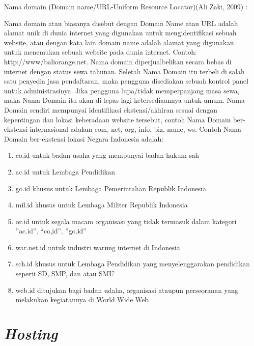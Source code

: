 Nama domain (Domain name/URL-Uniform Resource Locator)(Ali Zaki, 2009) \cite{7} :

Nama domain atau biasanya disebut dengan Domain Name atau URL adalah alamat unik di dunia internet yang digunakan untuk mengidentifikasi sebuah website, atau dengan kata lain domain name adalah alamat yang digunakan untuk menemukan sebuah website pada dunia internet. Contoh: http://www/baliorange.net. Nama domain diperjualbelikan secara bebas di internet dengan status sewa tahunan. Seletah Nama Domain itu terbeli di salah satu penyedia jasa pendaftaran, maka pengguna disediakan sebuah kontrol panel untuk administrasinya. Jika pengguna lupa/tidak memperpanjang masa sewa, maka Nama Domain itu akan di lepas lagi ketersediaannya untuk umum. Nama Domain sendiri mempunyai identifikasi ekstensi/akhiran sesuai dengan kepentingan dan lokasi keberadaan website tersebut, contoh Nama Domain ber-ekstensi internasional adalam com, net, org, info, biz, name, ws. Contoh Nama Domain ber-ekstensi lokasi Negara Indonesia adalah:

\begin{enumerate}
	\item co.id untuk badan usaha yang mempunyai badan hukum sah
	\item ac.id untuk Lembaga Pendidikan
	\item go.id khusus untuk Lembaga Pemerintahan Republik Indonesia
	\item mil.id khusus untuk Lembaga Militer Republik Indonesia
	\item or.id untuk segala macam organisasi yang tidak termasuk dalam kategori ”ac.id”, “co,id”, ”go.id”
	\item war.net.id untuk industri warung internet di Indonesia
	\item sch.id khusus untuk Lembaga Pendidikan yang menyelenggarakan pendidikan seperti SD, SMP, dan atau SMU
	\item web.id ditujukan bagi badan udaha, organisasi ataupun perseoranan yang melakukan kegiatannya di World Wide Web
\end{enumerate}

\section{\textit{Hosting}}

